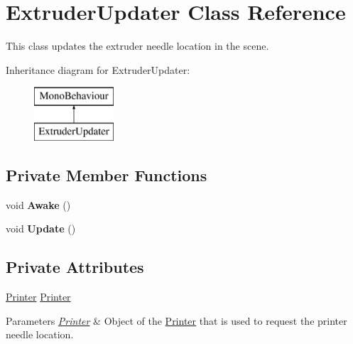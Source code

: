 \hypertarget{class_extruder_updater}{}\section{Extruder\+Updater Class Reference}
\label{class_extruder_updater}


This class updates the extruder needle location in the scene.  


Inheritance diagram for Extruder\+Updater\+:\begin{figure}[H]
\begin{center}
\leavevmode
\includegraphics[height=2.000000cm]{class_extruder_updater}
\end{center}
\end{figure}
\subsection*{Private Member Functions}
\begin{DoxyCompactItemize}
\item 
\mbox{\label{class_extruder_updater_ade597152d45f237ee471cacefa33ea26}} 
void {\bfseries Awake} ()
\item 
\mbox{\label{class_extruder_updater_a514efae7cd29b947bb7ff5ffa1328875}} 
void {\bfseries Update} ()
\end{DoxyCompactItemize}
\subsection*{Private Attributes}
\begin{DoxyCompactItemize}
\item 
\mbox{\label{class_extruder_updater_a5e88f8bf7b9b76c903b7171af14daea5}} 
\hyperlink{class_printer}{Printer} \hyperlink{class_extruder_updater_a5e88f8bf7b9b76c903b7171af14daea5}{Printer}
\begin{DoxyCompactList}\small\item\em 
\begin{DoxyParams}{Parameters}
{\em \hyperlink{class_printer}{Printer}} & Object of the \hyperlink{class_printer}{Printer} that is used to request the printer needle location.\\
\hline
\end{DoxyParams}
\end{DoxyCompactList}\end{DoxyCompactItemize}


